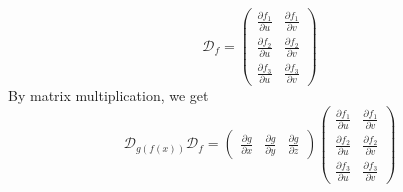 \documentclass[12pt]{article}
\begin{document}
\[ \mathcal{D}_f = 
\begin{pmatrix}
    \frac{\partial f_1}{\partial u} & \frac{\partial f_1}{\partial v} \\
    \frac{\partial f_2}{\partial u} & \frac{\partial f_2}{\partial v} \\
    \frac{\partial f_3}{\partial u} & \frac{\partial f_3}{\partial v} 
\end{pmatrix} \]
By matrix multiplication, we get 
\[\mathcal{D}_{g(f(x))}\mathcal{D}_f
= \begin{pmatrix}
    \frac{\partial g}{\partial x} & \frac{\partial g}{\partial y} & \frac{\partial g}{\partial z} 
\end{pmatrix} \begin{pmatrix}
    \frac{\partial f_1}{\partial u} & \frac{\partial f_1}{\partial v} \\
    \frac{\partial f_2}{\partial u} & \frac{\partial f_2}{\partial v} \\
    \frac{\partial f_3}{\partial u} & \frac{\partial f_3}{\partial v} 
\end{pmatrix}\]
\end{document}
